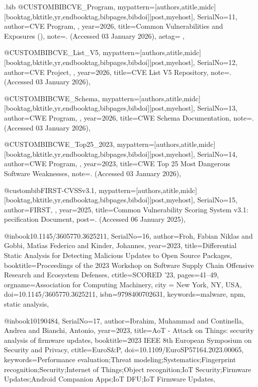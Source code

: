\documentclass[fleqn,s1,names,tex]{neptune}
\begin{document}
\begin{bibwrite}{\jobname.bib}
@CUSTOMBIB{CVE_Program,
mypattern={[authors,atitle,midc][booktag,bktitle,yr,endbooktag,bibpages,bibdoi][post,myehost]},
SerialNo={11},
author={{CVE Program}, {}},
year={2026},
title={Common Vulnerabilities and Exposures ()},
note={. (Accessed 03 January 2026)},
aetag={ },
}


@CUSTOMBIB{CVE_List_V5,
mypattern={[authors,atitle,midc][booktag,bktitle,yr,endbooktag,bibpages,bibdoi][post,myehost]},
SerialNo={12},
author={{CVE Project}, {}},
year={2026},
title={{CVE} List {V5} Repository},
note={. (Accessed 03 January 2026)},
}


@CUSTOMBIB{CWE_Schema,
mypattern={[authors,atitle,midc][booktag,bktitle,yr,endbooktag,bibpages,bibdoi][post,myehost]},
SerialNo={13},
author={{CWE Program}, {}},
year={2026},
title={{CWE} Schema Documentation},
note={. (Accessed 03 January 2026)},
}


@CUSTOMBIB{CWE_Top25_2023,
mypattern={[authors,atitle,midc][booktag,bktitle,yr,endbooktag,bibpages,bibdoi][post,myehost]},
SerialNo={14},
author={{CWE Program}, {}},
year={2023},
title={{CWE} Top 25 Most Dangerous Software Weaknesses},
note={. (Accessed 03 January 2026)},
}


@custombib{FIRST-CVSSv3.1,
mypattern={[authors,atitle,midc][booktag,bktitle,yr,endbooktag,bibpages,bibdoi][post,myehost]},
SerialNo={15},
author={{FIRST}, {}},
year={2025},
title={Common Vulnerability Scoring System v3.1: pecification Document},
 post={\xURL {}. (Accessed 06 January 2025)},
}


@inbook{10.1145/3605770.3625211,
SerialNo={16},
author={Froh, Fabian Niklas and Gobbi, Mat{\'\i}as Federico and Kinder,
  Johannes},
 year={2023},
title={Differential Static Analysis for Detecting Malicious Updates to Open
  Source Packages},
booktitle={Proceedings of the 2023 Workshop on Software Supply Chain Offensive   Research and Ecosystem Defenses},
ctitle={SCORED '23},
  pages={41--49},
 orgname={Association for Computing Machinery},
 city = {New York, NY, USA},
doi={10.1145/3605770.3625211},
 isbn={9798400702631},
 keywords={malware, npm, static analysis},
}


@inbook{10190484,
SerialNo={17},
author={Ibrahim, Muhammad and Continella, Andrea and Bianchi, Antonio},
 year={2023},
title={AoT - Attack on Things:  security analysis of {} firmware updates},
booktitle={2023 IEEE 8th European Symposium on Security and Privacy},
ctitle={EuroS\&P},
doi={10.1109/EuroSP57164.2023.00065},
 keywords={Performance evaluation;Threat modeling;Systematics;Fingerprint
  recognition;Security;Internet of Things;Object recognition;IoT
  Security;Firmware Updates;Android Companion Apps;IoT DFU;IoT Firmware
  Updates},
}



\end{bibwrite}
\end{document}
